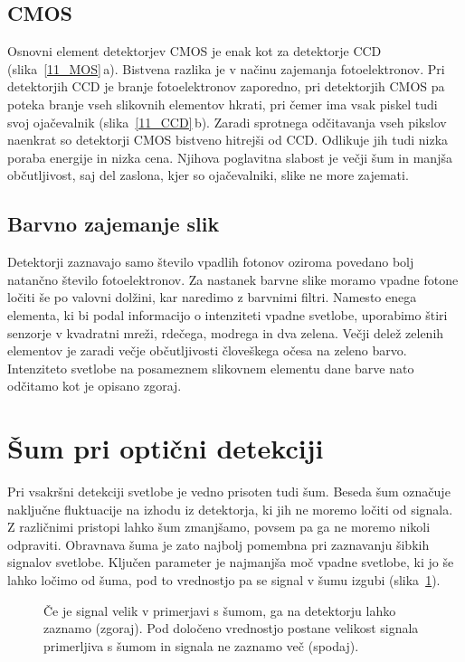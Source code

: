 \subsection*{CMOS}
Osnovni element detektorjev CMOS je enak kot za detektorje CCD (slika~\ref{11_MOS}\,a). 
Bistvena razlika je v načinu zajemanja fotoelektronov. Pri detektorjih CCD je branje 
fotoelektronov zaporedno, pri detektorjih CMOS pa poteka branje vseh slikovnih elementov 
hkrati, pri čemer ima vsak piskel tudi svoj ojačevalnik (slika~\ref{11_CCD}\,b).
Zaradi sprotnega odčitavanja vseh pikslov naenkrat so detektorji CMOS bistveno hitrejši 
od CCD. Odlikuje jih tudi nizka poraba energije in nizka cena. Njihova poglavitna slabost
je večji šum in manjša občutljivost, saj del zaslona, kjer so ojačevalniki, slike ne more
zajemati. 

\subsection*{Barvno zajemanje slik}
Detektorji zaznavajo samo število vpadlih fotonov oziroma povedano bolj natančno število fotoelektronov.
Za nastanek barvne slike moramo vpadne fotone ločiti še po valovni dolžini, kar naredimo
z barvnimi filtri. Namesto enega elementa, ki bi podal informacijo o intenziteti vpadne 
svetlobe, uporabimo štiri senzorje v kvadratni mreži, rdečega, modrega in dva zelena. 
Večji delež zelenih elementov je zaradi večje občutljivosti človeškega očesa na zeleno barvo. 
Intenziteto svetlobe na posameznem slikovnem elementu dane barve nato odčitamo kot je
opisano zgoraj.
 
\section{Šum pri optični detekciji}
Pri vsakršni detekciji svetlobe je vedno prisoten tudi šum. Beseda šum označuje naključne 
fluktuacije na izhodu iz detektorja, ki jih ne moremo ločiti od signala. Z različnimi 
pristopi lahko šum zmanjšamo, povsem pa ga ne moremo nikoli odpraviti. Obravnava 
šuma je zato najbolj pomembna pri zaznavanju šibkih signalov svetlobe. Ključen
parameter je najmanjša moč vpadne svetlobe, ki jo še lahko ločimo od šuma, pod to vrednostjo 
pa se signal v šumu izgubi (slika~\ref{11_sum}).
\begin{figure}[h]
\centering
\def\svgwidth{140truemm} 

\caption{Če je signal velik v primerjavi s šumom, ga na detektorju lahko zaznamo (zgoraj). 
Pod določeno vrednostjo postane velikost signala primerljiva s šumom in signala ne zaznamo več
(spodaj).}
\label{11_sum}
\end{figure}

